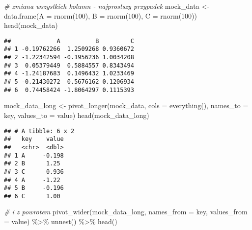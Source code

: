 \documentclass[
]{book}
\newenvironment{Shaded}{\begin{snugshade}}{\end{snugshade}}
\newcommand{\AttributeTok}[1]{\textcolor[rgb]{0.77,0.63,0.00}{#1}}
\newcommand{\CommentTok}[1]{\textcolor[rgb]{0.56,0.35,0.01}{\textit{#1}}}
\newcommand{\DecValTok}[1]{\textcolor[rgb]{0.00,0.00,0.81}{#1}}
\newcommand{\FunctionTok}[1]{\textcolor[rgb]{0.00,0.00,0.00}{#1}}
\newcommand{\NormalTok}[1]{#1}
\newcommand{\OtherTok}[1]{\textcolor[rgb]{0.56,0.35,0.01}{#1}}
\newcommand{\SpecialCharTok}[1]{\textcolor[rgb]{0.00,0.00,0.00}{#1}}
\newcommand{\StringTok}[1]{\textcolor[rgb]{0.31,0.60,0.02}{#1}}
\begin{document}
\begin{Shaded}
\begin{Highlighting}[]
\CommentTok{\# zmiana wszystkich kolumn {-} najprostszy przypadek}
\NormalTok{mock\_data }\OtherTok{\textless{}{-}} \FunctionTok{data.frame}\NormalTok{(}\AttributeTok{A =} \FunctionTok{rnorm}\NormalTok{(}\DecValTok{100}\NormalTok{), }\AttributeTok{B =} \FunctionTok{rnorm}\NormalTok{(}\DecValTok{100}\NormalTok{), }\AttributeTok{C =} \FunctionTok{rnorm}\NormalTok{(}\DecValTok{100}\NormalTok{))}
\FunctionTok{head}\NormalTok{(mock\_data)}
\end{Highlighting}
\end{Shaded}

\begin{verbatim}
##             A          B         C
## 1 -0.19762266  1.2509268 0.9360672
## 2 -1.22342594 -0.1956236 1.0034208
## 3  0.05379449  0.5884557 0.8343494
## 4 -1.24187683  0.1496432 1.0233469
## 5 -0.21430272  0.5676162 0.1206934
## 6  0.74458424 -1.8064297 0.1115393
\end{verbatim}

\begin{Shaded}
\begin{Highlighting}[]
\NormalTok{mock\_data\_long }\OtherTok{\textless{}{-}} \FunctionTok{pivot\_longer}\NormalTok{(mock\_data, }\AttributeTok{cols =} \FunctionTok{everything}\NormalTok{(), }\AttributeTok{names\_to =} \StringTok{\textquotesingle{}key\textquotesingle{}}\NormalTok{, }\AttributeTok{values\_to =} \StringTok{\textquotesingle{}value\textquotesingle{}}\NormalTok{)}
\FunctionTok{head}\NormalTok{(mock\_data\_long)}
\end{Highlighting}
\end{Shaded}

\begin{verbatim}
## # A tibble: 6 x 2
##   key    value
##   <chr>  <dbl>
## 1 A     -0.198
## 2 B      1.25 
## 3 C      0.936
## 4 A     -1.22 
## 5 B     -0.196
## 6 C      1.00
\end{verbatim}

\begin{Shaded}
\begin{Highlighting}[]
\CommentTok{\# i z powrotem}
\FunctionTok{pivot\_wider}\NormalTok{(mock\_data\_long, }\AttributeTok{names\_from =}\NormalTok{ key, }\AttributeTok{values\_from =}\NormalTok{ value) }\SpecialCharTok{\%\textgreater{}\%} \FunctionTok{unnest}\NormalTok{() }\SpecialCharTok{\%\textgreater{}\%} \FunctionTok{head}\NormalTok{()}
\end{Highlighting}
\end{Shaded}
\end{document}

